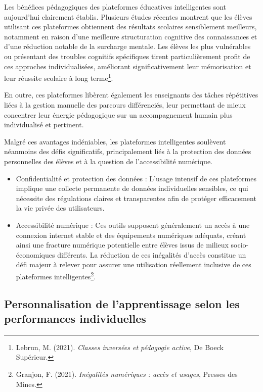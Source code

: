 \documentclass[12pt,a4paper]{report}
\begin{document}
Les bénéfices pédagogiques des plateformes éducatives intelligentes sont aujourd’hui clairement établis. Plusieurs études récentes montrent que les élèves utilisant ces plateformes obtiennent des résultats scolaires sensiblement meilleurs, notamment en raison d’une meilleure structuration cognitive des connaissances et d’une réduction notable de la surcharge mentale. Les élèves les plus vulnérables ou présentant des troubles cognitifs spécifiques tirent particulièrement profit de ces approches individualisées, améliorant significativement leur mémorisation et leur réussite scolaire à long terme\footnote{Lebrun, M. (2021). \textit{Classes inversées et pédagogie active}, De Boeck Supérieur.}.

En outre, ces plateformes libèrent également les enseignants des tâches répétitives liées à la gestion manuelle des parcours différenciés, leur permettant de mieux concentrer leur énergie pédagogique sur un accompagnement humain plus individualisé et pertinent.

Malgré ces avantages indéniables, les plateformes intelligentes soulèvent néanmoins des défis significatifs, principalement liés à la protection des données personnelles des élèves et à la question de l’accessibilité numérique.

\begin{itemize}

    \item Confidentialité et protection des données :
L’usage intensif de ces plateformes implique une collecte permanente de données individuelles sensibles, ce qui nécessite des régulations claires et transparentes afin de protéger efficacement la vie privée des utilisateurs.

    \item Accessibilité numérique :
Ces outils supposent généralement un accès à une connexion internet stable et des équipements numériques adéquats, créant ainsi une fracture numérique potentielle entre élèves issus de milieux socio-économiques différents. La réduction de ces inégalités d’accès constitue un défi majeur à relever pour assurer une utilisation réellement inclusive de ces plateformes intelligentes\footnote{Granjon, F. (2021). \textit{Inégalités numériques : accès et usages}, Presses des Mines.}.

\end{itemize}

\subsection{Personnalisation de l’apprentissage selon les performances individuelles}
\end{document}

